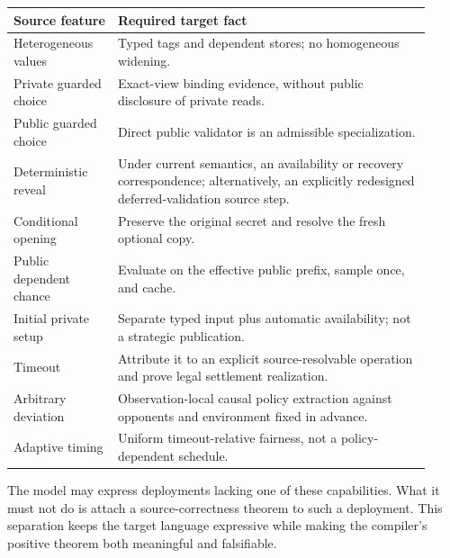 \documentclass[11pt]{article}
\begin{document}
\begin{center}
\begin{tabular}{>{\raggedright\arraybackslash}p{0.23\linewidth}
                >{\raggedright\arraybackslash}p{0.69\linewidth}}
Source feature & Required target fact \\
\hline
Heterogeneous values & Typed tags and dependent stores; no homogeneous widening.\\
Private guarded choice & Exact-view binding evidence, without public disclosure of private reads.\\
Public guarded choice & Direct public validator is an admissible specialization.\\
Deterministic reveal & Under current semantics, an availability or recovery correspondence; alternatively, an explicitly redesigned deferred-validation source step.\\
Conditional opening & Preserve the original secret and resolve the fresh optional copy.\\
Public dependent chance & Evaluate on the effective public prefix, sample once, and cache.\\
Initial private setup & Separate typed input plus automatic availability; not a strategic publication.\\
Timeout & Attribute it to an explicit source-resolvable operation and prove legal settlement realization.\\
Arbitrary deviation & Observation-local causal policy extraction against opponents and environment fixed in advance.\\
Adaptive timing & Uniform timeout-relative fairness, not a policy-dependent schedule.\\
\end{tabular}
\end{center}

The model may express deployments lacking one of these capabilities.  What it
must not do is attach a source-correctness theorem to such a deployment.  This
separation keeps the target language expressive while making the compiler's
positive theorem both meaningful and falsifiable.
\end{document}
